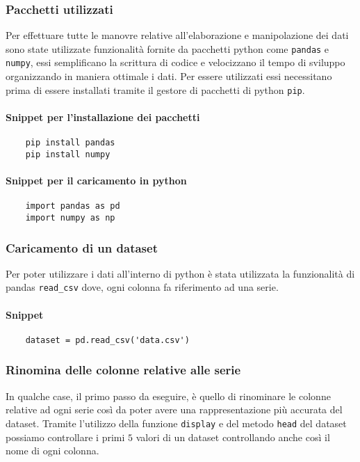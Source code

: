 \subsubsection{Pacchetti utilizzati}
Per effettuare tutte le manovre relative all'elaborazione e manipolazione dei dati sono state
utilizzate funzionalità fornite da pacchetti python come \texttt{pandas} e \texttt{numpy}, essi semplificano
la scrittura di codice e velocizzano il tempo di sviluppo organizzando in maniera ottimale
i dati. Per essere utilizzati essi necessitano prima di essere installati tramite il
gestore di pacchetti di python \texttt{pip}.
\paragraph{Snippet per l'installazione dei pacchetti}
\begin{verbatim}
    pip install pandas
    pip install numpy
\end{verbatim}
\paragraph{Snippet per il caricamento in python}
\begin{verbatim}
    import pandas as pd
    import numpy as np
\end{verbatim}



\subsubsection{Caricamento di un dataset}
Per poter utilizzare i dati all'interno di python è stata utilizzata
la funzionalità di pandas \texttt{read\_csv} dove, ogni colonna fa riferimento 
ad una serie.
\paragraph{Snippet}
\begin{verbatim}
    dataset = pd.read_csv('data.csv')
\end{verbatim}





\subsubsection{Rinomina delle colonne relative alle serie}
In qualche case, il primo passo da eseguire, è quello di rinominare
le colonne relative ad ogni serie così da poter avere una rappresentazione
più accurata del dataset.
Tramite l'utilizzo della funzione \texttt{display} e del metodo \texttt{head}
del dataset possiamo controllare i primi $5$ valori di un dataset
controllando anche così il nome di ogni colonna.
